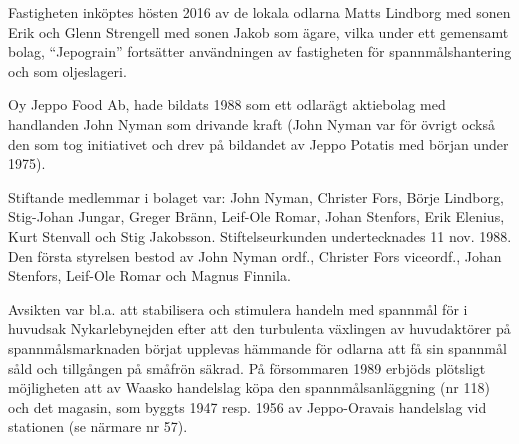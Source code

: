 









Fastigheten inköptes hösten 2016 av de lokala odlarna Matts Lindborg med sonen Erik och Glenn Strengell med sonen Jakob som ägare, vilka under ett gemensamt bolag, ``Jepograin'' fortsätter användningen av fastigheten för spannmålshantering och som oljeslageri.



Oy Jeppo Food Ab, hade bildats 1988 som ett odlarägt aktiebolag med handlanden John Nyman som drivande kraft (John Nyman var för övrigt också den som tog initiativet och drev på bildandet av Jeppo Potatis med början under 1975).

Stiftande medlemmar i bolaget var: John Nyman, Christer Fors, Börje Lindborg, Stig-Johan Jungar, Greger Bränn, Leif-Ole Romar, Johan Stenfors, Erik Elenius, Kurt Stenvall och Stig Jakobsson. Stiftelseurkunden undertecknades 11 nov. 1988. Den första styrelsen bestod av John Nyman ordf., Christer Fors viceordf., Johan Stenfors, Leif-Ole Romar och Magnus Finnila.

Avsikten var bl.a. att stabilisera och stimulera handeln med spannmål för i huvudsak Nykarlebynejden efter att den turbulenta växlingen av huvudaktörer på spannmålsmarknaden börjat upplevas hämmande för odlarna att få sin spannmål såld och tillgången på småfrön säkrad. På försommaren 1989 erbjöds plötsligt möjligheten att av Waasko handelslag köpa den spannmålsanläggning (nr 118) och det magasin, som byggts 1947 resp. 1956 av Jeppo-Oravais handelslag vid stationen (se närmare nr 57).


